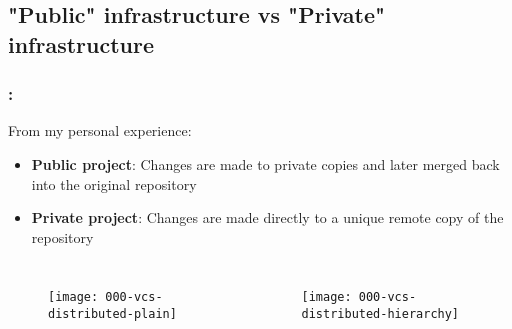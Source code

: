 \subsection{"Public" infrastructure vs "Private" infrastructure}

\begin{frame}
    \frametitle{\secname: \small\subsecname\normalsize}

    From my personal experience:

    \begin{itemize}
        \item \textbf{Public project}: Changes are made to private copies and later merged back into the original repository
        \item \textbf{Private project}: Changes are made directly to a unique remote copy of the repository
    \end{itemize}

    \begin{columns}
        \begin{figure}[h]
            \texttt{[image: 000-vcs-distributed-plain]}
            \centering
        \end{figure}

        \begin{figure}[h]
            \texttt{[image: 000-vcs-distributed-hierarchy]}
            \centering
        \end{figure}
    \end{columns}
\end{frame}

